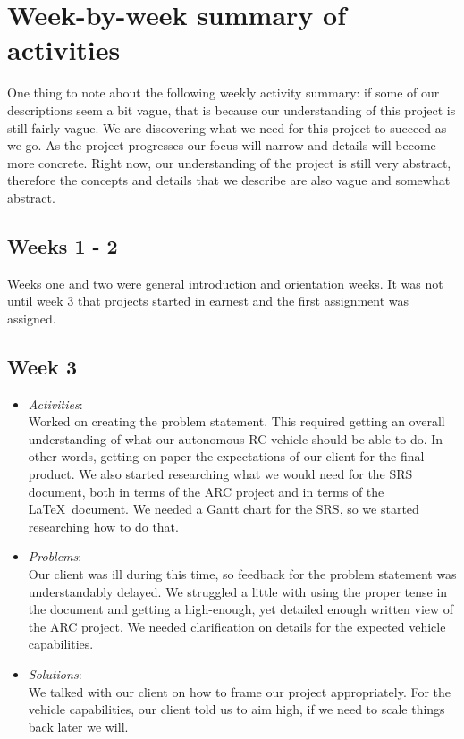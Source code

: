\documentclass[compsoc,draftclsnofoot,onecolumn,10pt]{IEEEtran}
\begin{document}
\section{Week-by-week summary of activities}

One thing to note about the following weekly activity summary: if some of our
descriptions seem a bit vague, that is because our understanding of this project
is still fairly vague. We are discovering what we need for this project to
succeed as we go. As the project progresses our focus will narrow and details
will become more concrete. Right now, our understanding of the project is still very
abstract, therefore the concepts and details that we describe are also vague and
somewhat abstract.

\subsection{Weeks 1 - 2}
Weeks one and two were general introduction and orientation weeks. It was
not until week 3 that projects started in earnest and the first assignment was
assigned.

\subsection{Week 3}
	\begin{itemize}
        \item \textit{Activities}:\\
            Worked on creating the problem statement. This required getting an
            overall understanding of what our autonomous RC vehicle should be able
            to do. In other words, getting on paper the expectations of our client
            for the final product. We also started researching what we would need
            for the SRS document, both in terms of the ARC project and in terms of
            the \LaTeX~document. We needed a Gantt chart for the SRS, so we started
            researching how to do that.

        \item \textit{Problems}:\\
            Our client was ill during this time, so feedback for the problem
            statement was understandably delayed. We struggled a little with using
            the proper tense in the document and getting a high-enough, yet detailed
            enough written view of the ARC project. We needed clarification on
            details for the expected vehicle capabilities.

        \item \textit{Solutions}:\\
            We talked with our client on how to frame our project appropriately.
            For the vehicle capabilities, our client told us to aim high, if we
            need to scale things back later we will.

	\end{itemize}
 
\end{document}
